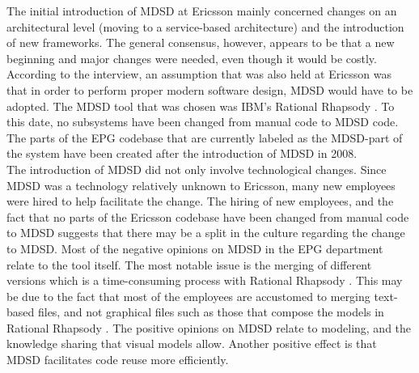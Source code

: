 \documentclass[final_report_innit.tex]{subfiles}
\begin{document}
The initial introduction of MDSD at Ericsson mainly concerned changes on an architectural level (moving to a service-based architecture) and the introduction of new frameworks. The general consensus, however, appears to be that a new beginning and major changes were needed, even though it would be costly. According to the interview, an assumption that was also held at Ericsson was that in order to perform proper modern software design, MDSD would have to be adopted. The MDSD tool that was chosen was IBM’s Rational Rhapsody \cite{rrf}. To this date, no subsystems have been changed from manual code to MDSD code. The parts of the EPG codebase that are currently labeled as the MDSD-part of the system have been created after the introduction of MDSD in 2008. 
\\

The introduction of MDSD did not only involve technological changes. Since MDSD was a technology relatively unknown to Ericsson, many new employees were hired to help facilitate the change. The hiring of new employees, and the fact that no parts of the Ericsson codebase have been changed from manual code to MDSD suggests that there may be a split in the culture regarding the change to MDSD. Most of the negative opinions on MDSD in the EPG department relate to the tool \cite{rrf} itself. The most notable issue is the merging of different versions which is a time-consuming process with Rational Rhapsody \cite{rrf}. This may be due to the fact that most of the employees are accustomed to merging text-based files, and not graphical files such as those that compose the models in Rational Rhapsody \cite{rrf}. The positive opinions on MDSD relate to modeling, and the knowledge sharing that visual models allow. Another positive effect is that MDSD facilitates code reuse more efficiently. 
\end{document}
